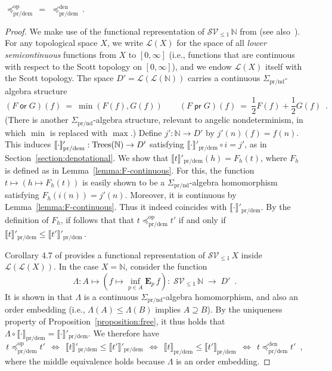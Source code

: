 \documentclass[a4paper,UKenglish]{lipics-v2018}
\newcommand{\Tree}{\textnormal{Trees}} %
\newcommand{\Basicleq}{\preccurlyeq}
\newcommand{\prEff}{\operatorname{\textsf{pr}}}
\newcommand{\orEff}{\operatorname{\textsf{or}}}
\newcommand{\prnd}{\text{pr/nd}}
\newcommand{\prdem}{\text{pr/dem}}
\newcommand{\Op}{\text{op}}
\newcommand{\Den}{\text{den}}
\newcommand{\Sem}[1]{\llbracket #1 \rrbracket}
\theoremstyle{plain}
\begin{document}
\begin{lemma}
${\Basicleq^\Op_\prdem} \, = \,\, \Basicleq^\Den_\prdem\,$.
\end{lemma}
\begin{proof}
We make use of the functional representation of $\mathcal{S}\mathcal{V}_{\leq 1}\, \mathbb{N}$ from \cite{KeimelP2016} (see also~\cite{JGL-mscs16}). 
For any topological space $X$, we write $\mathcal{L}(X)$ for the space of all
\emph{lower semicontinuous} functions from $X$ to $[0,\infty]$ (i.e., functions that are continuous with respect to the Scott topology on $[0,\infty]$), and we endow $\mathcal{L}(X)$ itself with the Scott topology. The space
$D' = \mathcal{L}(\mathcal{L}(\mathbb{N}))$ carries a continuous $\Sigma_\prnd$-algebra structure
\[
(F \orEff G)(f) ~ = ~ \min(F(f), G(f)) \qquad 
(F \prEff G)(f) ~ = ~ \frac{1}{2}F(f) + \frac{1}{2}G(f) \enspace .
\]
(There is another $\Sigma_\prnd$-algebra structure, relevant to angelic nondeterminism, in which  $\min$ is replaced with $\max$.) Define $j' : \mathbb{N} \to D'$ by $j'(n)(f) = f(n)$. This induces $\Sem{\cdot}'_\prdem : \Tree(\mathbb{N}) \to D'$
satisfying  $\Sem{\cdot}'_\prdem \circ i = j'$, as in Section~\ref{section:denotational}.
We show that $\Sem{t}'_\prdem (h) = F_h (t)$, where $F_h$ is defined as in
Lemma~\ref{lemma:F-continuous}. For this, the function $t \mapsto (h \mapsto F_h (t))$ is easily shown to be a $\Sigma_\prnd$-algebra homomorphism
satisfying $F_h(i(n)) = j'(n)$. Moreover, it is continuous by 
Lemma~\ref{lemma:F-continuous}. Thus it indeed coincides with 
$\Sem{\cdot}'_\prdem$. By the definition of $F_h$, if follows that that
$t \Basicleq^\Op_\prdem t'$ if and only if 
$\Sem{t}'_\prdem \leq \Sem{t'}'_\prdem \,$.

Corollary 4.7 of \cite{KeimelP2016} provides a functional representation of 
$\mathcal{S}\mathcal{V}_{\leq 1}\, X$ inside $\mathcal{L}(\mathcal{L}(X))$. In the case $X = \mathbb{N}$, consider the function
\[
\Lambda : A \mapsto \left(f \mapsto \inf_{p \in A} 
  \mathbf{E}_p\, f 
\right) 
 : \; \mathcal{S}\mathcal{V}_{\leq 1}\, \mathbb{N} \;  \to \; D' \enspace .
\]
It is shown in  \cite{KeimelP2016} that $\Lambda$  is a continuous $\Sigma_\prnd$-algebra homomorphism, and also an order embedding (i.e., $\Lambda(A) \leq \Lambda(B)$ implies $A \supseteq B$). 
By the uniqueness property of Proposition~\ref{proposition:free}, it thus holds that $\Lambda \circ \Sem{\cdot}_\prdem = \Sem{\cdot}'_\prdem$. We therefore have
\[
t \Basicleq^\Op_\prdem t' ~~ \Leftrightarrow ~ ~
  \Sem{t}'_\prdem \leq \Sem{t'}'_\prdem 
   ~~ \Leftrightarrow ~ ~
   \Sem{t}_\prdem \leq \Sem{t'}_\prdem 
      ~ ~\Leftrightarrow ~ ~
  t \Basicleq^\Den_\prdem t' \enspace ,
   \]
where the middle equivalence holds because $\Lambda$ is an order embedding.
\end{proof}
\end{document}
